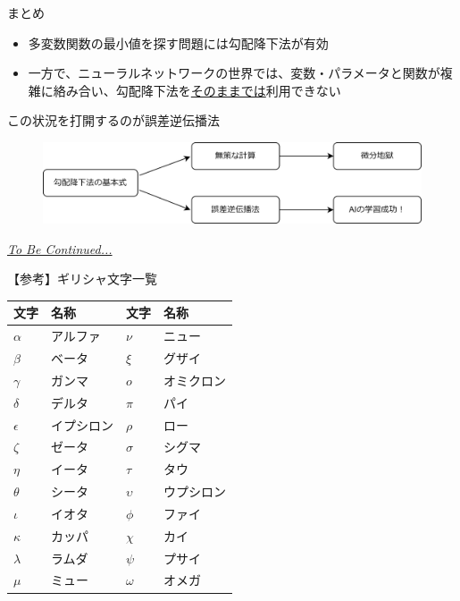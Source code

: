 \documentclass[dvipdfmx,aspectratio=169]{beamer}
\begin{document}
	\begin{frame}{まとめ}
		\begin{itemize}
			\item 多変数関数の最小値を探す問題には勾配降下法が有効
			\item 一方で、ニューラルネットワークの世界では、変数・パラメータと関数が複雑に絡み合い、勾配降下法を\underline{そのままでは}利用できない
		\end{itemize}
		\begin{center}
			この状況を打開するのが\alert{誤差逆伝播法}
		\end{center}
		\begin{figure}
			\centering
			\includegraphics[width=0.9\linewidth]{img/positioning-of-the-error-back-propagation-method}
		\end{figure}
	\end{frame}	
	\begin{frame}
		\begin{center}
			\textit{\uline{To Be Continued...}}
		\end{center}
	\end{frame}
	
	\begin{frame}{【参考】ギリシャ文字一覧}
		\begin{table}[]
			\begin{tabular}{ll|ll}
				\toprule
				文字         & 名称    & 文字         & 名称    \\
				\midrule
				$\alpha$   & アルファ  & $\nu$      & ニュー   \\
				$\beta$    & ベータ   & $\xi$      & グザイ   \\
				$\gamma$   & ガンマ   & $o$        & オミクロン \\
				$\delta$   & デルタ   & $\pi$      & パイ    \\
				$\epsilon$ & イプシロン & $\rho$     & ロー    \\
				$\zeta$    & ゼータ   & $\sigma$   & シグマ   \\
				$\eta$     & イータ   & $\tau$     & タウ    \\
				$\theta$   & シータ   & $\upsilon$ & ウプシロン \\
				$\iota$     & イオタ   & $\phi$     & ファイ   \\
				$\kappa$   & カッパ   & $\chi$     & カイ    \\
				$\lambda$  & ラムダ   & $\psi$     & プサイ   \\
				$\mu$      & ミュー   & $\omega$   & オメガ  \\
				\bottomrule
			\end{tabular}
		\end{table}
	\end{frame}
\end{document}
